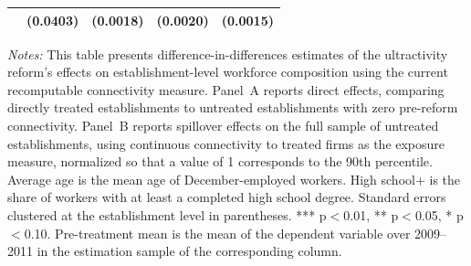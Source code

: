 \begin{table}[H]
\begin{tabular}{lcccc}
 & (0.0403) & (0.0018) & (0.0020) & (0.0015)\\
\bottomrule\bottomrule
\end{tabular}
\begin{minipage}{\linewidth}\vspace{4pt}
\scriptsize\textit{Notes:} This table presents difference-in-differences estimates of the ultractivity reform's effects on establishment-level workforce composition using the current recomputable connectivity measure. Panel~A reports direct effects, comparing directly treated establishments to untreated establishments with zero pre-reform connectivity. Panel~B reports spillover effects on the full sample of untreated establishments, using continuous connectivity to treated firms as the exposure measure, normalized so that a value of 1 corresponds to the 90th percentile. Average age is the mean age of December-employed workers. High school+ is the share of workers with at least a completed high school degree. Standard errors clustered at the establishment level in parentheses. *** p$<$0.01, ** p$<$0.05, * p$<$0.10. Pre-treatment mean is the mean of the dependent variable over 2009--2011 in the estimation sample of the corresponding column.
\end{minipage}
\end{table}
